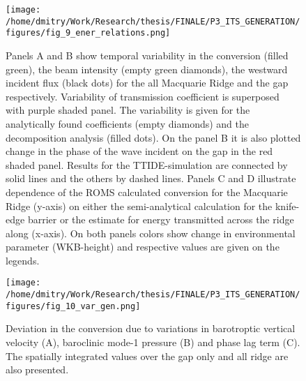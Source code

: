 \documentclass[12pt]{article}
\newcommand{\SCALEO}{2}
\newcommand{\SCALET}{1.25}
\begin{document}
\begin{figure}
	\centering
	\texttt{[image: /home/dmitry/Work/Research/thesis/FINALE/P3\_ITS\_GENERATION/figures/fig\_9\_ener\_relations.png]}
	\caption{Panels A and B show temporal variability in the conversion (filled green), the beam 
	intensity 	(empty green diamonds), the westward incident flux (black dots) for the all 
	Macquarie Ridge and the gap respectively. Variability of transmission coefficient is superposed 
	with purple shaded panel. The variability is given for the analytically found coefficients 
	(empty diamonds) and the decomposition analysis (filled dots). On the panel B it is also 
	plotted change in the phase of the wave incident on the gap in the red shaded panel. Results 
	for the 
	TTIDE-simulation are connected by solid lines and the others by dashed lines. Panels C and D 
	illustrate dependence of the ROMS calculated conversion for the Macquarie Ridge (y-axis) on 
	either the semi-analytical calculation for the knife-edge barrier or the estimate for 
	energy transmitted across the ridge along (x-axis). On both panels colors show change in 
	environmental parameter (WKB-height) and respective values are given on the legends.}
	\label{C3.fig:ener_var}
\end{figure}

\begin{figure}
	\centering
	\texttt{[image: /home/dmitry/Work/Research/thesis/FINALE/P3\_ITS\_GENERATION/figures/fig\_10\_var\_gen.png]}
	\caption{Deviation in the conversion due to variations in barotroptic vertical velocity (A), 
	baroclinic mode-1 pressure (B) and phase lag term (C). The spatially integrated values over the 
	gap only and all ridge are also presented.}
	\label{C3.fig:var_sp}
\end{figure}



\end{document}
